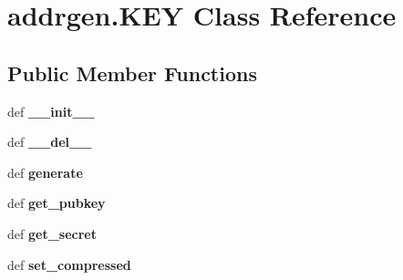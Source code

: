 \hypertarget{classaddrgen_1_1KEY}{\section{addrgen.\-K\-E\-Y \-Class \-Reference}
\label{classaddrgen_1_1KEY}
}
\subsection*{\-Public \-Member \-Functions}
\begin{DoxyCompactItemize}
\item 
\hypertarget{classaddrgen_1_1KEY_aca624024bcc39dd258f7f67aa2bbf955}{def {\bfseries \-\_\-\-\_\-init\-\_\-\-\_\-}}\label{classaddrgen_1_1KEY_aca624024bcc39dd258f7f67aa2bbf955}

\item 
\hypertarget{classaddrgen_1_1KEY_a5db5ae998873eb7ecfb68ea199362407}{def {\bfseries \-\_\-\-\_\-del\-\_\-\-\_\-}}\label{classaddrgen_1_1KEY_a5db5ae998873eb7ecfb68ea199362407}

\item 
\hypertarget{classaddrgen_1_1KEY_a7d159a7514b68672a498fb673df0241b}{def {\bfseries generate}}\label{classaddrgen_1_1KEY_a7d159a7514b68672a498fb673df0241b}

\item 
\hypertarget{classaddrgen_1_1KEY_a0368ff49f87888356110219a5438b049}{def {\bfseries get\-\_\-pubkey}}\label{classaddrgen_1_1KEY_a0368ff49f87888356110219a5438b049}

\item 
\hypertarget{classaddrgen_1_1KEY_aca02ce9f4401fb9029caef7bdd3808eb}{def {\bfseries get\-\_\-secret}}\label{classaddrgen_1_1KEY_aca02ce9f4401fb9029caef7bdd3808eb}

\item 
\hypertarget{classaddrgen_1_1KEY_a33d52f8fa2ec943536f19b869e341675}{def {\bfseries set\-\_\-compressed}}\label{classaddrgen_1_1KEY_a33d52f8fa2ec943536f19b869e341675}

\end{DoxyCompactItemize}
